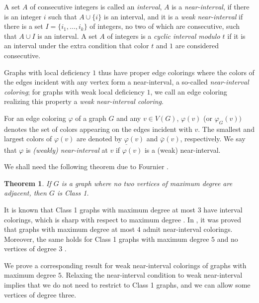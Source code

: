 \documentclass[12pt]{article}
\theoremstyle{plain}
\newtheorem{theorem}{Theorem}[section]
\theoremstyle{definition}
\numberwithin{equation}{section}
\begin{document}
	A set $A$ of consecutive integers is called an {\em interval}, $A$ is a
	{\em near-interval}, if there is an integer $i$ such that $A \cup \{i\}$ is an interval,
	and it is a {\em weak near-interval} if there is a set $I=\{i_1,\dots, i_k\}$ of
	integers, no two of which are consecutive, 
	such that $A \cup I$ is an interval. A set $A$ of integers is a {\em cyclic interval
	modulo $t$} if it is an interval under the extra condition that color $t$ and $1$ are considered
	consecutive.

	Graphs with local deficiency $1$ thus have proper edge colorings where the colors
	of the edges incident with any vertex form a near-interval, a so-called {\em near-interval coloring};
	for graphs with weak local deficiency $1$, we call an edge coloring realizing this property
	a {\em weak near-interval coloring}.

	For an edge coloring $\varphi$ of a graph $G$ and any $v\in V(G)$, $\varphi(v)$ (or $\varphi_{G}(v))$ denotes the set of colors appearing on the edges incident with $v$. 
The smallest and largest colors of $\varphi(v)$
are denoted by $\underline \varphi(v)$ and $\overline \varphi(v)$, respectively.
    We say that $\varphi$ is {\em (weakly) near-interval}
	at $v$ if $\varphi(v)$ is a (weak) near-interval.


	We shall need the following theorem due to Fournier \cite{Fournier}.
\begin{theorem}
\label{th:fournier}
	If $G$ is a graph where no two vertices of maximum degree are adjacent, then $G$ is Class 1.
\end{theorem}





	It is known that Class 1 graphs with maximum degree at most $3$
	have interval colorings, which is sharp with respect to maximum degree
	\cite{AsratianCasselgrenPetrosyan}. In \cite{CasselgrenPetrosyan}, it was proved
	that graphs with maximum degree at most $4$ admit near-interval colorings.
	Moreover, the same holds for Class 1 graphs with maximum degree $5$ and no vertices of degree $3$
	\cite{CasselgrenPetrosyan}.
	
	We prove a corresponding result for weak near-interval colorings of graphs with maximum degree
	$5$. Relaxing the near-interval condition to weak near-interval implies that
	we do not need to restrict to Class 1 graphs, and we can allow some
	vertices of degree three.
\end{document}
